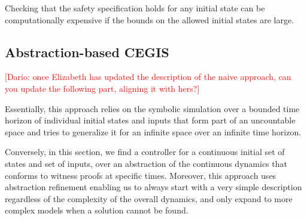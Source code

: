 \documentclass[twocolumn]{autart}    %
\begin{document}
Checking that the safety specification holds for any initial state can be
computationally expensive if the bounds on the allowed initial states are
large.

\subsection{Abstraction-based CEGIS} 
\label{sssec:abstraction}

\textcolor{red}{[Dario: once Elizabeth has updated the description of the naive approach, can you update the following part, aligning it with hers?]}


Essentially, this approach relies on the symbolic simulation over a bounded
time horizon of individual initial states and inputs that form part of an
uncountable space and tries to generalize it for an infinite space over an
infinite time horizon.





Conversely, in this section, we find a controller for a continuous initial
set of states and set of inputs, over an abstraction of the continuous
dynamics \cite{cattaruzza2015unbounded} that conforms to witness proofs at
specific times.  %
Moreover, this approach uses abstraction refinement enabling us to always
start with a very simple description regardless of the complexity of the
overall dynamics, and only expand to more complex models when a solution
cannot be found.
\end{document}
